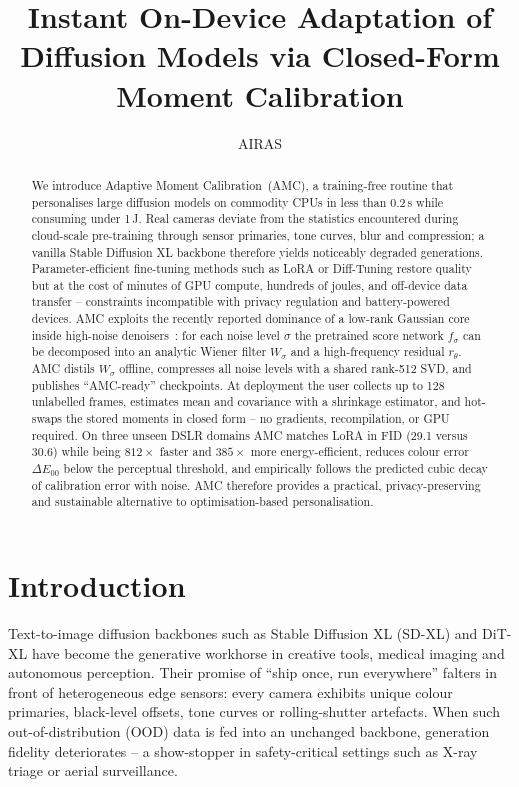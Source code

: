 \documentclass{article} %
\title{Instant On-Device Adaptation of Diffusion Models via Closed-Form Moment Calibration}
\author{AIRAS}
\begin{document}
\maketitle

\begin{abstract}
We introduce Adaptive Moment Calibration~(AMC), a training-free routine that personalises large diffusion models on commodity CPUs in less than 0.2\,s while consuming under 1\,J. Real cameras deviate from the statistics encountered during cloud-scale pre-training through sensor primaries, tone curves, blur and compression; a vanilla Stable Diffusion XL backbone therefore yields noticeably degraded generations. Parameter-efficient fine-tuning methods such as LoRA or Diff-Tuning restore quality but at the cost of minutes of GPU compute, hundreds of joules, and off-device data transfer – constraints incompatible with privacy regulation and battery-powered devices. AMC exploits the recently reported dominance of a low-rank Gaussian core inside high-noise denoisers~\cite{li_2024_understanding}: for each noise level $\sigma$ the pretrained score network $f_{\sigma}$ can be decomposed into an analytic Wiener filter $W_{\sigma}$ and a high-frequency residual $r_{\theta}$. AMC distils $W_{\sigma}$ offline, compresses all noise levels with a shared rank-512 SVD, and publishes ``AMC-ready'' checkpoints. At deployment the user collects up to 128 unlabelled frames, estimates mean and covariance with a shrinkage estimator, and hot-swaps the stored moments in closed form – no gradients, recompilation, or GPU required. On three unseen DSLR domains AMC matches LoRA in FID (29.1 versus 30.6) while being $812\times$ faster and $385\times$ more energy-efficient, reduces colour error $\Delta E_{00}$ below the perceptual threshold, and empirically follows the predicted cubic decay of calibration error with noise. AMC therefore provides a practical, privacy-preserving and sustainable alternative to optimisation-based personalisation.
\end{abstract}

\section{Introduction}
\label{sec:intro}
Text-to-image diffusion backbones such as Stable Diffusion XL (SD-XL) and DiT-XL have become the generative workhorse in creative tools, medical imaging and autonomous perception. Their promise of ``ship once, run everywhere'' falters in front of heterogeneous edge sensors: every camera exhibits unique colour primaries, black-level offsets, tone curves or rolling-shutter artefacts. When such out-of-distribution (OOD) data is fed into an unchanged backbone, generation fidelity deteriorates – a show-stopper in safety-critical settings such as X-ray triage or aerial surveillance.
\end{document}
